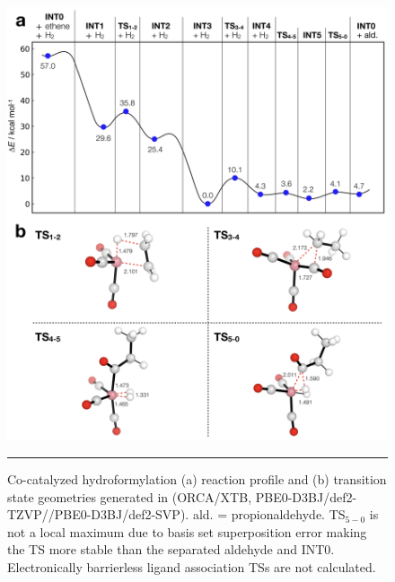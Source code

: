 \documentclass[../../main.tex]{subfiles}
\begin{document}
\begin{figure}[h!]
	\vspace{0.4cm}
	\centering
	\includegraphics[width=15cm]{5/autode/figs/figS16}
	\vspace{0.2cm}
	\hrule
	\caption{Co-catalyzed hydroformylation (a) reaction profile and (b) transition state geometries generated in \ade (ORCA/XTB, PBE0-D3BJ/def2-TZVP//PBE0-D3BJ/def2-SVP). ald. = propionaldehyde. TS${}_{5-0}$ is not a local maximum due to basis set superposition error making the TS more stable than the separated aldehyde and INT0. Electronically barrierless ligand association TSs are not calculated.}
	\label{fig::ade_si_16}
\end{figure}
\end{document}

